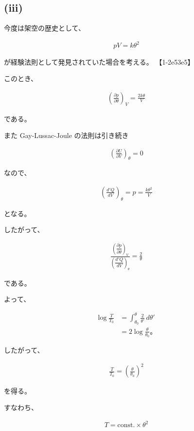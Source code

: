 \documentclass[platex,dvipdfmx,a4paper]{jsarticle}
\begin{document}
\subsection{(iii)}

今度は架空の歴史として、

\begin{align*}
pV=k\theta^2
\end{align*}

が経験法則として発見されていた場合を考える。 【1-2e53e5】

このとき、

\begin{align*}
\left(
\frac{\partial p}{\partial \theta}
\right)_V
=
\frac{2k\theta}{V}
\end{align*}

である。

また Gay-Lussac-Joule の法則は引き続き

\begin{align*}
\left(
\frac{\partial U}{\partial V}
\right)_\theta
=
0
\end{align*}

なので、

\begin{align*}
\left(
\frac{d'Q}{dV}
\right)_\theta
=
p
=
\frac{k\theta^2}{V}
\end{align*}

となる。

したがって、

\begin{align*}
\frac{
\left(
\dfrac{\partial p}{\partial \theta}
\right)_V
}{
\left(
\dfrac{d'Q}{dV}
\right)_\theta
}
=
\frac{2}{\theta}
\end{align*}

である。

よって、

\begin{align*}
\log\frac{T}{T_0}
&=
\int_{\theta_0}^{\theta}
\frac{2}{\theta'}\,d\theta' \\
&=
2\log\frac{\theta}{\theta_0}。
\end{align*}

したがって、

\begin{align*}
\frac{T}{T_0}
=
\left(
\frac{\theta}{\theta_0}
\right)^2
\end{align*}

を得る。

すなわち、

\begin{align*}
T
=
\mathrm{const.}\times\theta^2
\end{align*}
\end{document}
